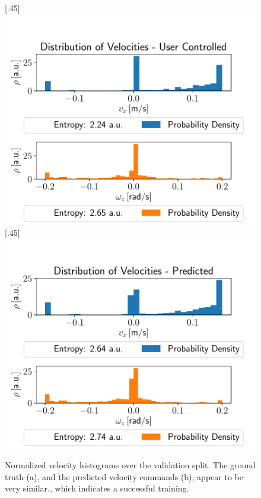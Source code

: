 \begin{figure}[h!]
	\centering
	[.45\linewidth]{\includegraphics[scale=.45]{chapters/04_experiments/02_autonomous_walking/user_entropy.pdf}}
	[.45\linewidth]{\includegraphics[scale=.45]{chapters/04_experiments/02_autonomous_walking/predicted_entropy_kldivx_0_33_kldivz_0_06_imgs_13441_duration_4_ms.pdf}}
	\caption{Normalized velocity histograms over the validation split. The ground truth (a), and the predicted velocity commands (b), appear to be very similar., which indicates a successful training.}
	\label{fig::423_training_dist}
\end{figure}
